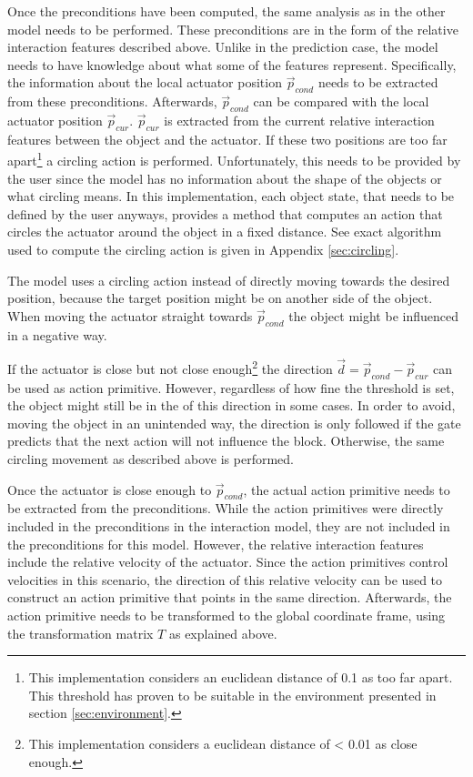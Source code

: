 Once the preconditions have been computed, the same analysis as in the other model needs to be performed. These preconditions are in the form of the relative interaction features described above.
Unlike in the prediction case, the model needs to have knowledge about what some of the features represent. Specifically, the information about the local actuator position $\vec{p}_{cond}$ needs to be extracted from these preconditions. Afterwards, $\vec{p}_{cond}$ can be compared with the local actuator position $\vec{p}_{cur}$. $\vec{p}_{cur}$ is extracted from the current relative interaction features between the object and the actuator. 
If these two positions are too far apart\footnote{This implementation considers an euclidean distance of 0.1 as too far apart. This threshold has proven to be suitable in the environment presented in section \ref{sec:environment}.} a circling action is performed. Unfortunately, this needs to be provided by the user since the model has no information about the shape of the objects or what circling means. In this implementation, each object state, that needs to be defined by the user anyways, provides a method that computes an action that circles the actuator around the object in a fixed distance.
See exact algorithm used to compute the circling action is given in Appendix \ref{sec:circling}.

The model uses a circling action instead of directly moving towards the desired position, because the target position might be on another side of the object. When moving the actuator straight towards $\vec{p}_{cond}$ the object might be influenced in a negative way.

If the actuator is close but not close enough\footnote{This implementation considers a euclidean distance of < 0.01 as close enough.} the direction $\vec{d} = \vec{p}_{cond} - \vec{p}_{cur}$ can be used as action primitive.
However, regardless of how fine the threshold is set, the object might still be in the of this direction in some cases. In order to avoid, moving the object in an unintended way, the direction is only followed if the gate predicts that the next action will not influence the block. Otherwise, the same circling movement as described above is performed.

Once the actuator is close enough to $\vec{p}_{cond}$, the actual action primitive needs to be extracted from the preconditions. 
While the action primitives were directly included in the preconditions in the interaction model, they are not included in the preconditions for this model. 
However, the relative interaction features include the relative velocity of the actuator. 
Since the action primitives control velocities in this scenario, the direction of this relative velocity can be used to construct an action primitive that points in the same direction. Afterwards, the action primitive needs to be transformed to the global coordinate frame, using the transformation matrix $T$ as explained above.

